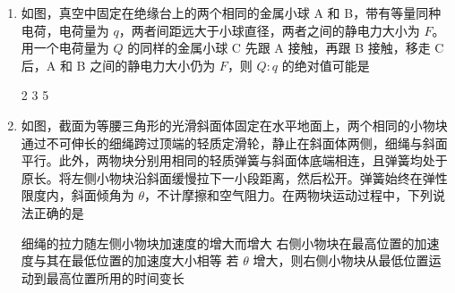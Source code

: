 \documentclass[\gkver]{gaokaozhenti}
\begin{document}
\begin{enumerate}
{引力势能为 $E_{p} = \frac{1}{2}mg_{0}R_{0}$

根据万有引力提供向心力 $\frac{GMm}{(2R_{0})^{2}} = m\frac{v^{2}}{(2R_{0})}$，在地球表面有 $\frac{GMm}{R_{0}^{2}} = mg_{0}$，解得轨道速度满足 $v^{2} = \frac{g_{0}R_{0}}{2}$，对应动能 $E_{k} = \frac{1}{2}mv^{2} = \frac{1}{4}mg_{0}R_{0}$，总机械能 $E_{\text{总}} = \frac{3}{4}mg_{0}R_{0}$

根据机械能守恒，初始动能 $\frac{1}{2}mv_{0}^{2} = E_{\text{总}}$，解得 $v_{0} = \sqrt{\frac{3g_{0}R_{0}}{2}}$。

故选 B。
}

\item
如图，真空中固定在绝缘台上的两个相同的金属小球 A 和 B，带有等量同种电荷，电荷量为 $q$，两者间距远大于小球直径，两者之间的静电力大小为 $F$。用一个电荷量为 $Q$ 的同样的金属小球 C 先跟 A 接触，再跟 B 接触，移走 C 后，A 和 B 之间的静电力大小仍为 $F$，则 $Q:q$ 的绝对值可能是


{2}
{3}
{5}


\item
如图，截面为等腰三角形的光滑斜面体固定在水平地面上，两个相同的小物块通过不可伸长的细绳跨过顶端的轻质定滑轮，静止在斜面体两侧，细绳与斜面平行。此外，两物块分别用相同的轻质弹簧与斜面体底端相连，且弹簧均处于原长。将左侧小物块沿斜面缓慢拉下一小段距离，然后松开。弹簧始终在弹性限度内，斜面倾角为 $\theta$，不计摩擦和空气阻力。在两物块运动过程中，下列说法正确的是


{细绳的拉力随左侧小物块加速度的增大而增大}
{右侧小物块在最高位置的加速度与其在最低位置的加速度大小相等}
{若 $\theta$ 增大，则右侧小物块从最低位置运动到最高位置所用的时间变长}


\end{enumerate}
\end{document}
